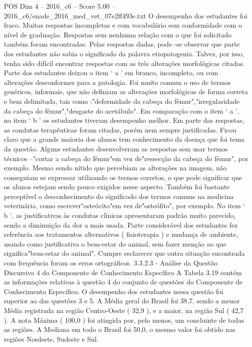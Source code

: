 \begin{textsample}{POS Dim 4 – 2016\_c6 – Score 5.00 – 2016\_c6/enade\_2016\_med\_vet\_07e2ff493e.txt}
O desempenho dos estudantes foi fraco.
Muitas respostas incompletas e com vocabulário sem conformidade com o nível de graduação.
Respostas sem nenhuma relação com o que foi solicitado também foram encontradas.
Pelas respostas dadas, pode -se observar que parte dos estudantes não sabia o significado da palavra etiopatogenia.
Talvez, por isso, tenha sido difícil encontrar respostas com as três alterações morfológicas citadas.
Parte dos estudantes deixou o item ‘ a ’ em branco, incompleto, ou com alterações desconformes para a patologia.
Foi muito comum o uso de termos genéricos, informais, que não definiam as alterações morfológicas de forma correta e bem delimitada, tais como :"deformidade da cabeça do fêmur","irregularidade da cabeça do fêmur","desgaste do acetábulo".
Em comparação com o item ‘ a ’, no item ‘ b ’ os estudantes tiveram desempenho melhor.
Em parte das respostas, as condutas terapêuticas foram citadas, porém nem sempre justificadas.
Ficou claro que a grande maioria dos alunos tem conhecimento da doença que foi tema da questão.
Alguns estudantes desenvolveram as respostas sem usar termos técnicos –"cortar a cabeça do fêmur"em vez de"ressecção da cabeça do fêmur", por exemplo.
Mesmo sendo nítido que percebiam as alterações na imagem, não conseguiam se expressar utilizando os termos corretos, o que pode significar que os alunos estejam sendo pouco exigidos nesse aspecto.
Também foi bastante perceptível o desconhecimento do significado dos termos comuns na medicina veterinária, como escrever"osteócito"em vez de"osteófito", por exemplo.
No item ‘ b ’, as justificativas às condutas clínicas apresentaram padrão muito parecido, sendo a diminuição da dor a mais usada.
Parte considerável dos estudantes fez referência aos tratamentos alternativos ( fisioterapia ) e mudança de ambiente, usando como justificativa o bem-estar do animal, sem fazer menção ao que significa"bem-estar do animal".
Cumpre esclarecer que outra situação encontrada com frequência foram os erros ortográficos. 3.3.2.3 - Análise da Questão Discursiva 4 do Componente de Conhecimento Específico A Tabela 3.19 contém as informações relativas à questão 4 do conjunto de questões do Componente de Conhecimento Específico.
O desempenho dos estudantes nessa questão foi superior ao das questões 3 e 5.
A Média geral do Brasil foi 38,7, sendo a menor Média registrada na região Centro-Oeste ( 32,9 ), e a maior, na região Sul ( 42,7 ).
A nota Máxima ( 100,0 ) foi atingida por, pelo menos, um concluinte de todas as regiões.
A Mediana em todo o Brasil foi 50,0, o mesmo valor foi obtido nas regiões Nordeste, Sudeste e Sul.

\end{textsample}
